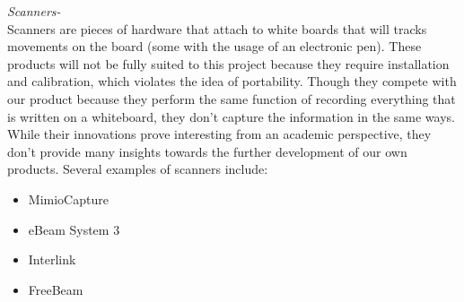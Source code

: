 \documentclass{article}
\begin{document}
			
			\noindent \emph{Scanners-}\\
Scanners are pieces of hardware that attach to white boards that will tracks movements on the board (some with the usage of an electronic pen). These products will not be fully suited to this project because they require installation and calibration, which violates the idea of portability. Though they compete with our product because they perform the same function of recording everything that is written on a whiteboard, they don't capture the information in the same ways. While their innovations prove interesting from an academic perspective, they don't provide many insights towards the further development of our own products. Several examples of scanners include:
			\begin{itemize}
				\item MimioCapture
				\item eBeam System 3
				\item Interlink
				\item FreeBeam
			\end{itemize}
			
\end{document}
